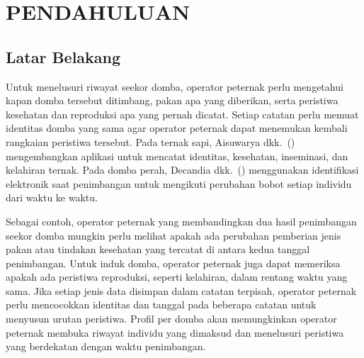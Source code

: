 \chapter{PENDAHULUAN}

\section{Latar Belakang}

Untuk menelusuri riwayat seekor domba, {\setlength{\fboxsep}{1pt}\colorbox{revisilama}{operator}} {\setlength{\fboxsep}{1pt}\colorbox{revisibaru}{peternak}} perlu mengetahui kapan domba
tersebut ditimbang, pakan apa yang diberikan, serta peristiwa kesehatan dan
reproduksi apa yang pernah dicatat. Setiap catatan perlu memuat identitas domba
yang sama agar {\setlength{\fboxsep}{1pt}\colorbox{revisilama}{operator}} {\setlength{\fboxsep}{1pt}\colorbox{revisibaru}{peternak}} dapat menemukan kembali rangkaian peristiwa tersebut.
Pada ternak sapi, Aisuwarya dkk.~(\citeyear{aisuwarya2019rfid}) mengembangkan
aplikasi untuk mencatat identitas, kesehatan, inseminasi, dan kelahiran ternak.
Pada domba perah, Decandia dkk.~(\citeyear{decandia2026domba}) menggunakan
identifikasi elektronik saat penimbangan untuk mengikuti perubahan bobot
setiap individu dari waktu ke waktu.

Sebagai contoh, {\setlength{\fboxsep}{1pt}\colorbox{revisilama}{operator}} {\setlength{\fboxsep}{1pt}\colorbox{revisibaru}{peternak}} yang membandingkan dua hasil penimbangan seekor
domba mungkin perlu melihat apakah ada perubahan pemberian jenis pakan atau
tindakan kesehatan yang tercatat di antara kedua tanggal penimbangan.
Untuk induk domba, {\setlength{\fboxsep}{1pt}\colorbox{revisilama}{operator}} {\setlength{\fboxsep}{1pt}\colorbox{revisibaru}{peternak}} juga dapat memeriksa apakah ada peristiwa
reproduksi, seperti kelahiran, dalam rentang waktu yang sama. Jika setiap
jenis data disimpan dalam catatan terpisah, {\setlength{\fboxsep}{1pt}\colorbox{revisilama}{operator}} {\setlength{\fboxsep}{1pt}\colorbox{revisibaru}{peternak}} perlu mencocokkan
identitas dan tanggal pada beberapa catatan untuk menyusun urutan peristiwa.
Profil per domba akan memungkinkan {\setlength{\fboxsep}{1pt}\colorbox{revisilama}{operator}} {\setlength{\fboxsep}{1pt}\colorbox{revisibaru}{peternak}} membuka riwayat individu yang
dimaksud dan menelusuri peristiwa yang berdekatan dengan waktu penimbangan.

